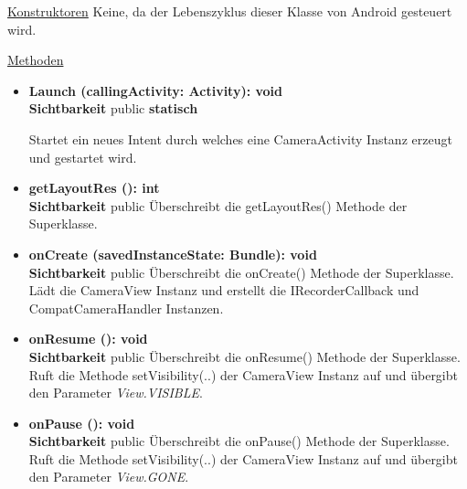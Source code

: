 \underline{Konstruktoren}\newline
\indent Keine, da der Lebenszyklus dieser Klasse von Android gesteuert wird.\newline

\underline{Methoden}
\begin{itemize}
\itemsep0pt

\item \textbf{Launch (callingActivity: Activity): void}\hfill\\
\textbf{Sichtbarkeit} public \newline
\textbf{statisch} 

Startet ein neues Intent durch welches eine CameraActivity Instanz erzeugt und gestartet wird.

\item \textbf{getLayoutRes (): int}\hfill\\
\textbf{Sichtbarkeit} public\newline
Überschreibt die getLayoutRes() Methode der Superklasse.

\item \textbf{onCreate (savedInstanceState: Bundle): void}\hfill\\
\textbf{Sichtbarkeit} public\newline
Überschreibt die onCreate() Methode der Superklasse. Lädt die CameraView Instanz und erstellt die IRecorderCallback und CompatCameraHandler Instanzen.

\item \textbf{onResume (): void}\hfill\\
\textbf{Sichtbarkeit} public\newline
Überschreibt die onResume() Methode der Superklasse. Ruft die Methode setVisibility(..) der CameraView Instanz auf und übergibt den Parameter \textit{View.VISIBLE}.

\item \textbf{onPause (): void}\hfill\\
\textbf{Sichtbarkeit} public\newline
Überschreibt die onPause() Methode der Superklasse. Ruft die Methode setVisibility(..) der CameraView Instanz auf und übergibt den Parameter \textit{View.GONE}.

\end{itemize}